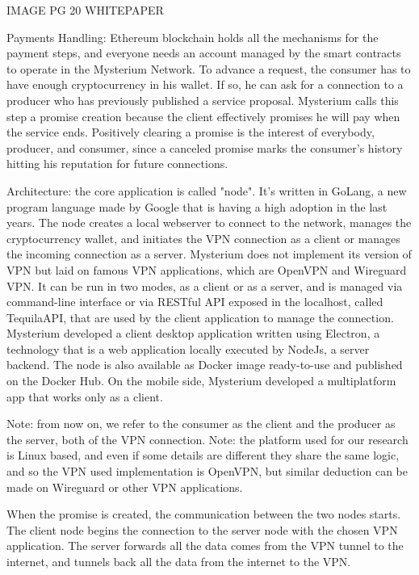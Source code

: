 \documentclass[]{article}
\begin{document}
	IMAGE PG 20 WHITEPAPER

	Payments Handling: Ethereum blockchain holds all the mechanisms for the payment steps, and everyone needs an account managed by the smart contracts to operate in the Mysterium Network. To advance a request, the consumer has to have enough cryptocurrency in his wallet. If so, he can ask for a connection to a producer who has previously published a service proposal. Mysterium calls this step a promise creation because the client effectively promises he will pay when the service ends.  Positively clearing a promise is the interest of everybody, producer, and consumer, since a canceled promise marks the consumer's history hitting his reputation for future connections.


	Architecture: the core application is called "node". It's written in GoLang, a new program language made by Google that is having a high adoption in the last years. The node creates a local webserver to connect to the network, manages the cryptocurrency wallet, and initiates the VPN connection as a client or manages the incoming connection as a server. Mysterium does not implement its version of VPN but laid on famous VPN applications, which are OpenVPN and Wireguard VPN. 
	It can be run in two modes, as a client or as a server, and is managed via command-line interface or via RESTful API exposed in the localhost, called TequilaAPI, that are used by the client application to manage the connection. Mysterium developed a client desktop application written using Electron, a technology that is a web application locally executed by NodeJs, a server backend.
	The node is also available as Docker image ready-to-use and published on the Docker Hub. 
	On the mobile side, Mysterium developed a multiplatform app that works only as a client.

	Note: from now on, we refer to the consumer as the client and the producer as the server, both of the VPN connection.
	Note: the platform used for our research is Linux based, and even if some details are different they share the same logic, and so the VPN used implementation is OpenVPN, but similar deduction can be made on Wireguard or other VPN applications.

	When the promise is created, the communication between the two nodes starts. The client node begins the connection to the server node with the chosen VPN application. The server forwards all the data comes from the VPN tunnel to the internet, and tunnels back all the data from the internet to the VPN.
\end{document}
